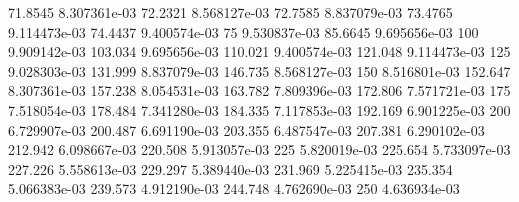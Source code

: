 71.8545  8.307361e-03
72.2321  8.568127e-03
72.7585  8.837079e-03
73.4765  9.114473e-03
74.4437  9.400574e-03
75  9.530837e-03
85.6645  9.695656e-03
100  9.909142e-03
103.034  9.695656e-03
110.021  9.400574e-03
121.048  9.114473e-03
125  9.028303e-03
131.999  8.837079e-03
146.735  8.568127e-03
150  8.516801e-03
152.647  8.307361e-03
157.238  8.054531e-03
163.782  7.809396e-03
172.806  7.571721e-03
175  7.518054e-03
178.484  7.341280e-03
184.335  7.117853e-03
192.169  6.901225e-03
200  6.729907e-03
200.487  6.691190e-03
203.355  6.487547e-03
207.381  6.290102e-03
212.942  6.098667e-03
220.508  5.913057e-03
225  5.820019e-03
225.654  5.733097e-03
227.226  5.558613e-03
229.297  5.389440e-03
231.969  5.225415e-03
235.354  5.066383e-03
239.573  4.912190e-03
244.748  4.762690e-03
250  4.636934e-03
